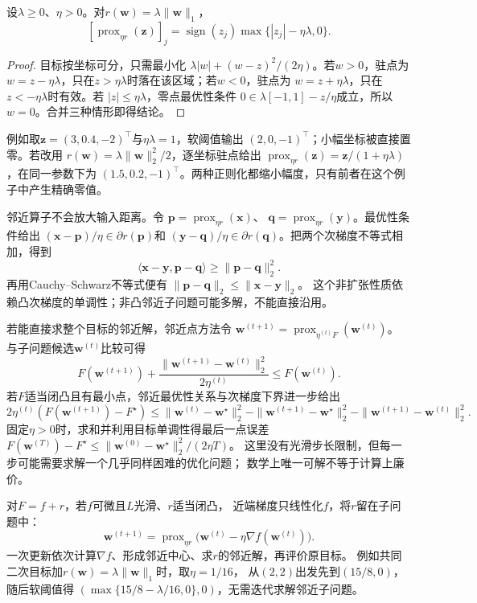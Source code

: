 \begin{theorem}
\label{thm:opt-soft-threshold}
设$\lambda\geq0$、$\eta>0$。对$r(\bm{w})=\lambda\lVert\bm{w}\rVert_1$，
\[
  [\operatorname{prox}_{\eta r}(\bm{z})]_j
  =\operatorname{sign}(z_j)\max\{|z_j|-\eta\lambda,0\}.
\]
\end{theorem}

\begin{proof}
目标按坐标可分，只需最小化
$\lambda|w|+(w-z)^2/(2\eta)$。若$w>0$，驻点为
$w=z-\eta\lambda$，只在$z>\eta\lambda$时落在该区域；若$w<0$，驻点为
$w=z+\eta\lambda$，只在$z<-\eta\lambda$时有效。若
$|z|\leq\eta\lambda$，零点最优性条件
$0\in\lambda[-1,1]-z/\eta$成立，所以$w=0$。合并三种情形即得结论。
\end{proof}

例如取$\bm z=(3,0.4,-2)^{\top}$与$\eta\lambda=1$，软阈值输出
$(2,0,-1)^{\top}$；小幅坐标被直接置零。若改用
$r(\bm w)=\lambda\lVert\bm w\rVert_2^2/2$，逐坐标驻点给出
$\operatorname{prox}_{\eta r}(\bm z)=\bm z/(1+\eta\lambda)$，在同一参数下为
$(1.5,0.2,-1)^{\top}$。两种正则化都缩小幅度，只有前者在这个例子中产生精确零值。

邻近算子不会放大输入距离。令
$\bm{p}=\operatorname{prox}_{\eta r}(\bm{x})$、
$\bm{q}=\operatorname{prox}_{\eta r}(\bm{y})$。最优性条件给出
$(\bm{x}-\bm{p})/\eta\in\partial r(\bm{p})$和
$(\bm{y}-\bm{q})/\eta\in\partial r(\bm{q})$。把两个次梯度不等式相加，得到
\[
  \langle\bm{x}-\bm{y},\bm{p}-\bm{q}\rangle
  \geq\lVert\bm{p}-\bm{q}\rVert_2^2.
\]
再用Cauchy--Schwarz不等式便有
$\lVert\bm{p}-\bm{q}\rVert_2\leq\lVert\bm{x}-\bm{y}\rVert_2$。
这个非扩张性质依赖凸次梯度的单调性；非凸邻近子问题可能多解，不能直接沿用。

若能直接求整个目标的邻近解，邻近点方法令
$\bm w^{(t+1)}=\operatorname{prox}_{\eta^{(t)} F}(\bm w^{(t)})$。
与子问题候选$\bm w^{(t)}$比较可得
\[
 F(\bm w^{(t+1)})+\frac{\|\bm w^{(t+1)}-\bm w^{(t)}\|_2^2}{2\eta^{(t)}}
 \leq F(\bm w^{(t)}).
\]
若$F$适当闭凸且有最小点，邻近最优性关系与次梯度下界进一步给出
\[
 2\eta^{(t)}(F(\bm w^{(t+1)})-F^\star)
 \leq\|\bm w^{(t)}-\bm w^\star\|_2^2
 -\|\bm w^{(t+1)}-\bm w^\star\|_2^2
 -\|\bm w^{(t+1)}-\bm w^{(t)}\|_2^2.
\]
固定$\eta>0$时，求和并利用目标单调性得最后一点误差
$F(\bm w^{(T)})-F^\star\leq\|\bm w^{(0)}-\bm w^\star\|_2^2/(2\eta T)$。
这里没有光滑步长限制，但每一步可能需要求解一个几乎同样困难的优化问题；
数学上唯一可解不等于计算上廉价。

对$F=f+r$，若$f$可微且$L$光滑、$r$适当闭凸，
近端梯度只线性化$f$，将$r$留在子问题中：
\begin{equation}
 \bm w^{(t+1)}
 =\operatorname{prox}_{\eta r}
   \bigl(\bm w^{(t)}-\eta\nabla f(\bm w^{(t)})\bigr).
 \label{eq:opt-proximal-gradient-update}
\end{equation}
一次更新依次计算$\nabla f$、形成邻近中心、求$r$的邻近解，再评价原目标。
例如共同二次目标加$r(\bm w)=\lambda\|\bm w\|_1$时，取$\eta=1/16$，
从$(2,2)$出发先到$(15/8,0)$，随后软阈值得
$(\max\{15/8-\lambda/16,0\},0)$，无需迭代求解邻近子问题。

